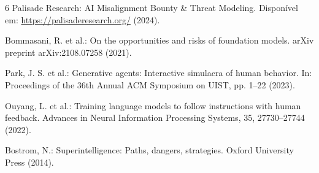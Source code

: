 \documentclass[runningheads]{llncs}
\begin{document}
\begin{thebibliography}{6}
Palisade Research: AI Misalignment Bounty \& Threat Modeling. Disponível em: \url{https://palisaderesearch.org/} (2024).

Bommasani, R. et al.: On the opportunities and risks of foundation models. arXiv preprint arXiv:2108.07258 (2021).

Park, J. S. et al.: Generative agents: Interactive simulacra of human behavior. In: Proceedings of the 36th Annual ACM Symposium on UIST, pp. 1--22 (2023).

Ouyang, L. et al.: Training language models to follow instructions with human feedback. Advances in Neural Information Processing Systems, 35, 27730--27744 (2022).

Bostrom, N.: Superintelligence: Paths, dangers, strategies. Oxford University Press (2014).
\end{thebibliography}
\end{document}
